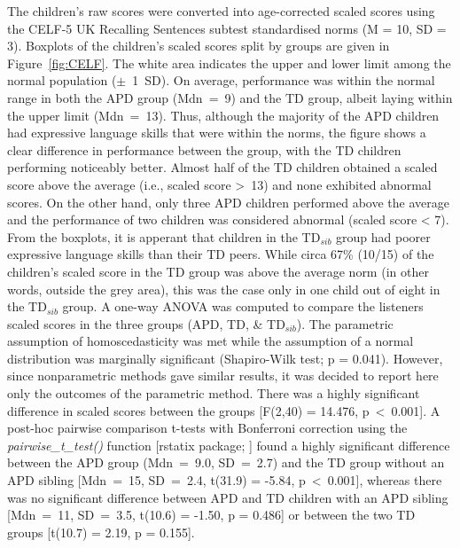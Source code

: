 \documentclass[a4paper, twoside]{templates/ociamthesis}
\begin{document}
The children's raw scores were converted into age-corrected scaled scores using the CELF-5 UK Recalling Sentences subtest standardised norms (M = 10, SD = 3). Boxplots of the children's scaled scores split by groups are given in Figure~\ref{fig:CELF}. The white area indicates the upper and lower limit among the normal population (\(\pm\)~1~SD). On average, performance was within the normal range in both the APD group (Mdn~=~9) and the TD group, albeit laying within the upper limit (Mdn~=~13). Thus, although the majority of the APD children had expressive language skills that were within the norms, the figure shows a clear difference in performance between the group, with the TD children performing noticeably better. Almost half of the TD children obtained a scaled score above the average (i.e., scaled score \textgreater~13) and none exhibited abnormal scores. On the other hand, only three APD children performed above the average and the performance of two children was considered abnormal (scaled score \textless{} 7).\\

From the boxplots, it is apperant that children in the TD\(_{sib}\) group had poorer expressive language skills than their TD peers. While circa 67\% (10/15) of the children's scaled score in the TD group was above the average norm (in other words, outside the grey area), this was the case only in one child out of eight in the TD\(_{sib}\) group. A one-way ANOVA was computed to compare the listeners scaled scores in the three groups (APD, TD, \& TD\(_{sib}\)). The parametric assumption of homoscedasticity was met while the assumption of a normal distribution was marginally significant (Shapiro-Wilk test; p = 0.041). However, since nonparametric methods gave similar results, it was decided to report here only the outcomes of the parametric method. There was a highly significant difference in scaled scores between the groups {[}F(2,40) = 14.476, p~\textless~0.001{]}. A post-hoc pairwise comparison t-tests with Bonferroni correction using the \emph{pairwise\_t\_test()} function {[}rstatix package; \textcite{rstatixPackageR}{]} found a highly significant difference between the APD group (Mdn~=~9.0, SD~=~2.7) and the TD group without an APD sibling {[}Mdn~=~15, SD~=~2.4, t(31.9) = -5.84, p~\textless~0.001{]}, whereas there was no significant difference between APD and TD children with an APD sibling {[}Mdn~=~11, SD~=~3.5, t(10.6) = -1.50, p = 0.486{]} or between the two TD groups {[}t(10.7) = 2.19, p = 0.155{]}.\\
\end{document}
